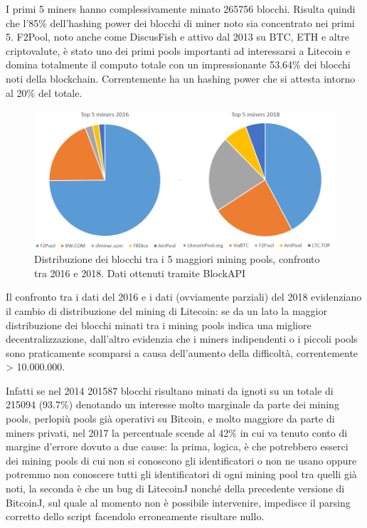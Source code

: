 I primi 5 miners hanno complessivamente minato 265756 blocchi. Risulta quindi che l’85\% dell’hashing power dei blocchi di miner noto sia concentrato nei primi 5. 
F2Pool, noto anche come DiscusFish e attivo dal 2013 su BTC, ETH e altre criptovalute, è stato uno dei primi pools importanti ad interessarsi a Litecoin e domina totalmente il computo totale con un impressionante 53.64\% dei blocchi noti della blockchain. Correntemente ha un hashing power che si attesta intorno al 20\% del totale.

\begin{figure}[h!]
	\centering
	\includegraphics[width=1.0\linewidth]{images/top5miners2016vs2018}
	\caption{Distribuzione dei blocchi tra i 5 maggiori mining pools, confronto tra 2016 e 2018. Dati ottenuti tramite BlockAPI}
	\label{fig:top5miners2016vs2018}
\end{figure}



Il confronto tra i dati del 2016 e i dati (ovviamente parziali) del 2018 evidenziano il cambio di distribuzione del mining di Litecoin: se da un lato la maggior distribuzione dei blocchi minati tra i mining pools indica una migliore decentralizzazione, dall’altro evidenzia che i miners indipendenti o i piccoli pools sono praticamente scomparsi a causa dell’aumento della difficoltà, correntemente > 10.000.000.

Infatti se nel 2014 201587 blocchi risultano minati da ignoti su un totale di 215094 (93.7\%) denotando un interesse molto marginale da parte dei mining pools, perlopiù pools già operativi su Bitcoin, e molto maggiore da parte di miners privati, nel 2017 la percentuale scende al 42\% in cui va tenuto conto di margine d’errore dovuto a due cause: la prima, logica, è che potrebbero esserci dei mining pools di cui non si conoscono gli identificatori o non ne usano oppure potremmo non conoscere tutti gli identificatori di ogni mining pool tra quelli già noti, la seconda è che un bug di LitecoinJ nonché della precedente versione di BitcoinJ, sul quale al momento non è possibile intervenire, impedisce il parsing corretto dello script facendolo erroneamente risultare nullo.

